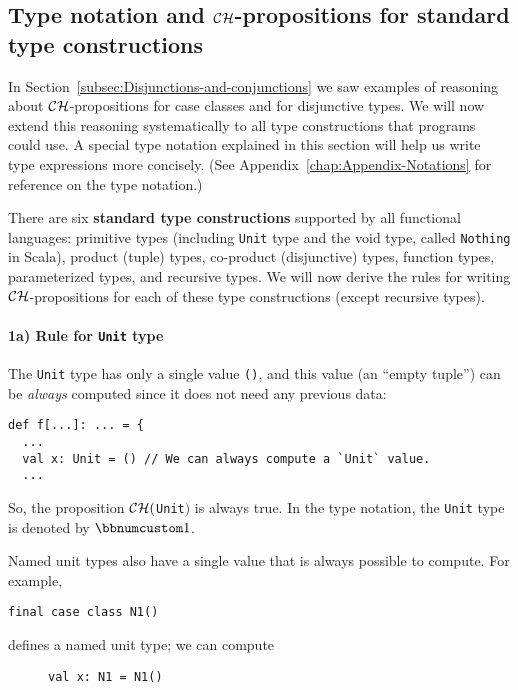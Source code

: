 \subsection{Type notation and ${\cal CH}$-propositions for standard type constructions\label{subsec:Type-notation-and-standard-type-constructions}}

In Section~\ref{subsec:Disjunctions-and-conjunctions} we saw examples
of reasoning about ${\cal CH}$-propositions for case classes and
for disjunctive types. We will now extend this reasoning systematically
to all type constructions that programs could use. A special type
notation explained in this section will help
us write type expressions more concisely. (See Appendix~\ref{chap:Appendix-Notations}
for reference on the type notation.)

There are six \textbf{standard type constructions}
supported by all functional languages: primitive types (including
\lstinline!Unit! type and the void type, called \lstinline!Nothing!
in Scala), product (tuple) types, co-product (disjunctive) types,
function types, parameterized types, and recursive types. We will
now derive the rules for writing ${\cal CH}$-propositions for each
of these type constructions (except recursive types).

\paragraph{1a) Rule for \lstinline!Unit! type}

The \lstinline!Unit! type has only a single value \lstinline!()!,
and this value (an \textsf{``}empty tuple\textsf{''}) can be \emph{always} computed
since it does not need any previous data:
\begin{lstlisting}
def f[...]: ... = {
  ...
  val x: Unit = () // We can always compute a `Unit` value.
  ...
\end{lstlisting}
So, the proposition ${\cal CH}($\lstinline!Unit!$)$ is always true.
In the type notation, the \lstinline!Unit! type is denoted by $\bbnum 1$.

Named unit types also have a single value
that is always possible to compute. For example,
\begin{lstlisting}
final case class N1()
\end{lstlisting}
defines a named unit type; we can compute

\begin{wrapfigure}{l}{0.44\columnwidth}%
\vspace{-0.7\baselineskip}
\begin{lstlisting}
val x: N1 = N1()
\end{lstlisting}

\vspace{-0.9\baselineskip}
\end{wrapfigure}%

